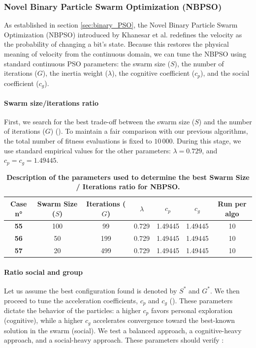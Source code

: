 \documentclass[12pt, openany]{article}
\begin{document}
\subsubsection{Novel Binary Particle Swarm Optimization (NBPSO)}\label{sec:cases_nbpso}

As established in section \ref{sec:binary_PSO}, the Novel Binary Particle Swarm Optimization (NBPSO) introduced by Khanesar et al. \cite{4433821} redefines the velocity as the probability of changing a bit's state. Because this restores the physical meaning of velocity from the continuous domain, we can tune the NBPSO using standard continuous PSO parameters: the swarm size ($S$), the number of iterations ($G$), the inertia weight ($\lambda$), the cognitive coefficient ($c_p$), and the social coefficient ($c_g$).

\paragraph{Swarm size/iterations ratio} First, we search for the best trade-off between the swarm size ($S$) and the number of iterations ($G$) (). To maintain a fair comparison with our previous algorithms, the total number of fitness evaluations is fixed to $10\,000$. During this stage, we use standard empirical values for the other parameters: $\lambda=0.729$, and $c_p = c_g = 1.49445$.

\begin{table}[H]
    \centering
    \renewcommand{\arraystretch}{1.5}
    \begin{tabular}{|c|c|c|c|c|c|c|}
        \hline 
        \textbf{Case n°} & \textbf{Swarm Size ($S$)} & \textbf{Iterations ($G$)} & $\lambda$ & $c_p$ & $c_g$ & \textbf{Run per algo} \\ \hline

        \textbf{55} & 100 & 99 & 0.729 & 1.49445 & 1.49445 & 10 \\ \hdashline
        \textbf{56} & 50 & 199 & 0.729 & 1.49445 & 1.49445 & 10 \\ \hdashline
        \textbf{57} & 20 & 499 & 0.729 & 1.49445 & 1.49445 & 10 \\ 
        \hline
    \end{tabular}
    \caption{\textbf{Description of the parameters used to determine the best Swarm Size / Iterations ratio for NBPSO.}}
    \label{tab:Cases_Determine_NBPSO_Pop_Gen}
\end{table}

\paragraph{Ratio social and group} Let us assume the best configuration found is denoted by $S^*$ and $G^*$. We then proceed to tune the acceleration coefficients, $c_p$ and $c_g$ (). These parameters dictate the behavior of the particles: a higher $c_p$ favors personal exploration (cognitive), while a higher $c_g$ accelerates convergence toward the best-known solution in the swarm (social). We test a balanced approach, a cognitive-heavy approach, and a social-heavy approach. These parameters should verify \cite{4433821}:
\end{document}
